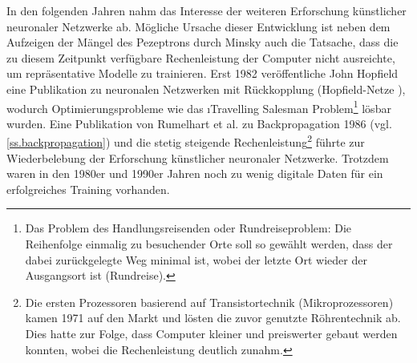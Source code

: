 In den folgenden Jahren nahm das Interesse der weiteren Erforschung künstlicher neuronaler Netzwerke ab. Mögliche Ursache dieser Entwicklung ist neben dem Aufzeigen der Mängel des Pezeptrons durch Minsky auch die Tatsache, dass die zu diesem Zeitpunkt verfügbare Rechenleistung der Computer nicht ausreichte, um repräsentative Modelle zu trainieren. Erst 1982 veröffentliche John Hopfield eine Publikation zu neuronalen Netzwerken mit Rückkopplung (Hopfield-Netze \citep{Hopfield1982}), wodurch Optimierungsprobleme wie das \i{Travelling Salesman Problem}\footnote{Das Problem des Handlungsreisenden oder Rundreiseproblem: Die Reihenfolge einmalig zu besuchender Orte soll so gewählt werden, dass der dabei zurückgelegte Weg minimal ist, wobei der letzte Ort wieder der Ausgangsort ist (Rundreise).} lösbar wurden. Eine Publikation von Rumelhart et al. zu Backpropagation 1986 \citep{Rumelhart1986} (vgl. \autoref{ss.backpropagation}) und die stetig steigende Rechenleistung\footnote{Die ersten Prozessoren basierend auf Transistortechnik (Mikroprozessoren) kamen 1971 auf den Markt und lösten die zuvor genutzte Röhrentechnik ab. Dies hatte zur Folge, dass Computer kleiner und preiswerter gebaut werden konnten, wobei die Rechenleistung deutlich zunahm.} führte zur Wiederbelebung der Erforschung künstlicher neuronaler Netzwerke. Trotzdem waren in den 1980er und 1990er Jahren noch zu wenig digitale Daten für ein erfolgreiches Training vorhanden.


